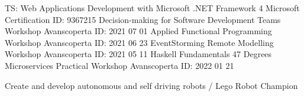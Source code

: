 \documentclass[9pt]{developercv}
\begin{document}


\begin{entrylist}
        {TS\@: Web Applications Development with Microsoft \@.NET Framework 4}
        {Microsoft Certification}
        {ID\@: 9367215}
        {Decision-making for Software Development Teams Workshop}
        {Avanscoperta}
        {ID\@: 2021 07 01}
        {Applied Functional Programming Workshop}
        {Avanscoperta}
        {ID\@: 2021 06 23}
        {EventStorming Remote Modelling Workshop}
        {Avanscoperta}
        {ID\@: 2021 05 11}
        {Haskell Fundamentals}
        {47 Degrees}
        {}
        {Microservices Practical Workshop}
        {Avanscoperta}
        {ID\@: 2022 01 21}
\end{entrylist}



\begin{entrylist}
        {Create and develop autonomous and self driving robots / Lego Robot Champion}
        {}
        {}
\end{entrylist}

\end{document}
